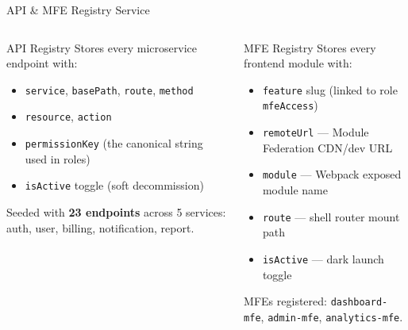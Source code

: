 \documentclass[aspectratio=169]{beamer}
\begin{document}
\begin{frame}{API \& MFE Registry Service}
  \begin{columns}[t]
    \begin{block}{API Registry}
      Stores every microservice endpoint with:
      \begin{itemize}
        \item \texttt{service}, \texttt{basePath}, \texttt{route}, \texttt{method}
        \item \texttt{resource}, \texttt{action}
        \item \texttt{permissionKey} (the canonical string used in roles)
        \item \texttt{isActive} toggle (soft decommission)
      \end{itemize}
      \medskip
      Seeded with \textbf{23 endpoints} across 5 services:
      auth, user, billing, notification, report.
    \end{block}

    \begin{block}{MFE Registry}
      Stores every frontend module with:
      \begin{itemize}
        \item \texttt{feature} slug (linked to role \texttt{mfeAccess})
        \item \texttt{remoteUrl} --- Module Federation CDN/dev URL
        \item \texttt{module} --- Webpack exposed module name
        \item \texttt{route} --- shell router mount path
        \item \texttt{isActive} --- dark launch toggle
      \end{itemize}
       MFEs registered: \texttt{dashboard-mfe}, \texttt{admin-mfe}, \texttt{analytics-mfe}.
    \end{block}
  \end{columns}
\end{frame}
\end{document}
